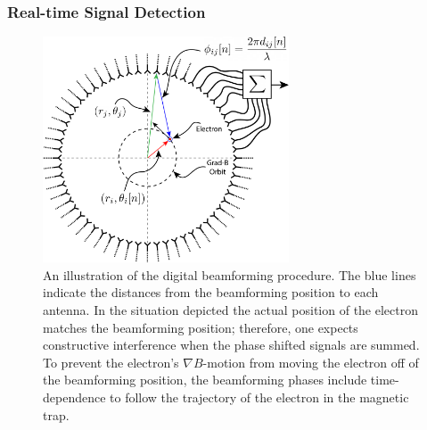 

\subsubsection{Real-time Signal Detection}
\label{sec:bf-and-stft}

\begin{figure}[htbp]
    \centering
    \includegraphics[width=0.65\textwidth]{figs/Chapter-4/230803_beamforming_diagram.png}
    \caption{An illustration of the digital beamforming procedure. The blue lines indicate the distances from the beamforming position to each antenna. In the situation depicted the actual position of the electron matches the beamforming position; therefore, one expects constructive interference when the phase shifted signals are summed. To prevent the electron's $\nabla B$-motion from moving the electron off of the beamforming position, the beamforming phases include time-dependence to follow the trajectory of the electron in the magnetic trap.}
    \label{fig:chap4-beamforming}
\end{figure}

